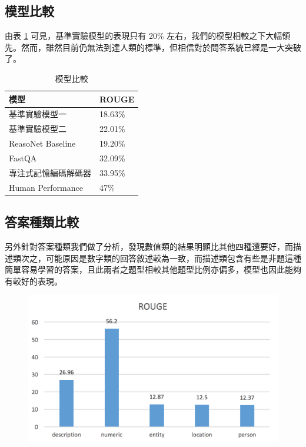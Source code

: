 \subsection{模型比較}
由表 \ref{table:model} 可見，基準實驗模型的表現只有 20\% 左右，我們的模型相較之下大幅領先。然而，雖然目前仍無法到達人類的標準，但相信對於問答系統已經是一大突破了。
\begin{table}
    \caption{模型比較}
    \label{table:model}
    \centering
    \begin{tabular}{|l|l|}
        \hline
        模型 & ROUGE\\
        \hline
        基準實驗模型一 & 18.63\% \\
        \hline
        基準實驗模型二 & 22.01\% \\%
        \hline
        ReasoNet Baseline \cite{shen2016reasonet}& 19.20\% \\
        \hline
        FastQA \cite{weissenborn2017making} &32.09\% \\
        \hline
        專注式記憶編碼解碼器 &  33.95\% \\ %
        \hline
        Human Performance &47\% \\ %
        \hline
    \end{tabular}
\end{table}
\subsection{答案種類比較}
另外針對答案種類我們做了分析，發現數值類的結果明顯比其他四種還要好，而描述類次之，可能原因是數字類的回答敘述較為一致，而描述類包含有些是非題這種簡單容易學習的答案，且此兩者之題型相較其他題型比例亦偏多，模型也因此能夠有較好的表現。%
\begin{figure}
    \centering
    \includegraphics[scale=0.5]{images/chap3_rouge_dist.png}
    \caption{}
    \label{fig:rouge_dist}
\end{figure}
